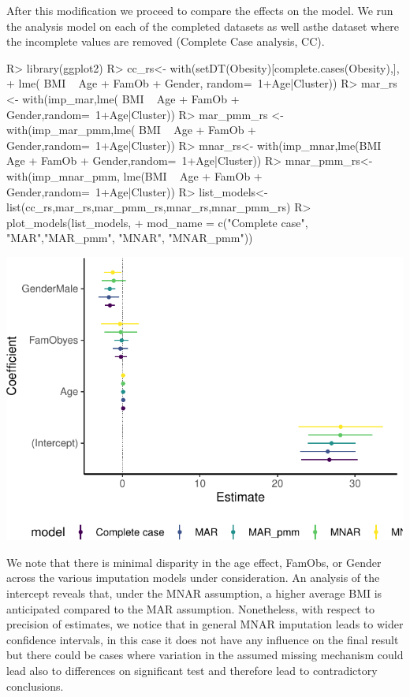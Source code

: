 \documentclass[
]{jss}
\begin{document}
After this modification we proceed to compare the effects on the model.
We run the analysis model on each of the completed datasets as well
asthe dataset where the incomplete values are removed (Complete Case
analysis, CC).

\begin{CodeChunk}
\begin{CodeInput}
R> library(ggplot2)
R> cc_rs<- with(setDT(Obesity)[complete.cases(Obesity),],
+              lme( BMI ~ Age + FamOb + Gender, random=~1+Age|Cluster))
R> mar_rs <- with(imp_mar,lme( BMI ~ Age + FamOb + Gender,random=~1+Age|Cluster))
R> mar_pmm_rs <- with(imp_mar_pmm,lme( BMI ~ Age + FamOb + Gender,random=~1+Age|Cluster))
R> mnar_rs<- with(imp_mnar,lme(BMI ~ Age + FamOb + Gender,random=~1+Age|Cluster))
R> mnar_pmm_rs<- with(imp_mnar_pmm, lme(BMI ~ Age + FamOb + Gender,random=~1+Age|Cluster))
R> list_models<-list(cc_rs,mar_rs,mar_pmm_rs,mnar_rs,mnar_pmm_rs)
R> plot_models(list_models,
+             mod_name = c("Complete case", "MAR","MAR_pmm", "MNAR", "MNAR_pmm"))
\end{CodeInput}


\begin{center}\includegraphics{Imputation_of_Incomplete_Multilevel_Data_files/figure-latex/models-1} \end{center}

\end{CodeChunk}

We note that there is minimal disparity in the age effect, FamObs, or
Gender across the various imputation models under consideration. An
analysis of the intercept reveals that, under the MNAR assumption, a
higher average BMI is anticipated compared to the MAR assumption.
Nonetheless, with respect to precision of estimates, we notice that in
general MNAR imputation leads to wider confidence intervals, in this
case it does not have any influence on the final result but there could
be cases where variation in the assumed missing mechanism could lead
also to differences on significant test and therefore lead to
contradictory conclusions.
\end{document}
